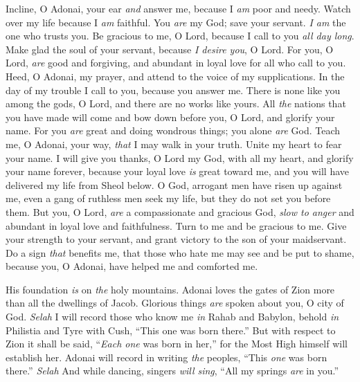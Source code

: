 \begin{biblechapter} %
 Incline, O Adonai, your ear \textit{and} answer me, 
because I \textit{am} poor and needy.
\verse Watch over my life because I \textit{am} faithful. 
You \textit{are} my God; save your servant. 
\textit{I am} the one who trusts you.
\verse Be gracious to me, O Lord, 
because I call to you \textit{all day long}.
\verse Make glad the soul of your servant, 
because \textit{I desire you}, O Lord.
\verse For you, O Lord, \textit{are} good and forgiving, 
and abundant in loyal love for all who call to you.
\verse Heed, O Adonai, my prayer, 
and attend to the voice of my supplications.
\verse In the day of my trouble I call to you, 
because you answer me.
\verse There is none like you among the gods, O Lord, 
and there are no works like yours.
\verse All \textit{the} nations that you have made will come 
and bow down before you, O Lord, 
and glorify your name.
\verse For you \textit{are} great and doing wondrous things; 
you alone \textit{are} God.
\verse Teach me, O Adonai, your way, 
\textit{that} I may walk in your truth. 
Unite my heart to fear your name.
\verse I will give you thanks, O Lord my God, with all my heart, 
and glorify your name forever,
\verse because your loyal love \textit{is} great toward me, 
and you will have delivered my life from Sheol below.
\verse O God, arrogant men have risen up against me, 
even a gang of ruthless men seek my life, 
but they do not set you before them.
\verse But you, O Lord, \textit{are} a compassionate and gracious God, 
\textit{slow to anger} and abundant in loyal love and faithfulness.
\verse Turn to me and be gracious to me. 
Give your strength to your servant, 
and grant victory to the son of your maidservant.
\verse Do a sign \textit{that} benefits me, 
that those who hate me may see and be put to shame, 
because you, O Adonai, have helped me and comforted me.
\end{biblechapter}

\begin{biblechapter} %
 His foundation \textit{is} on \textit{the} holy mountains.
\verse Adonai loves the gates of Zion 
more than all the dwellings of Jacob.
\verse Glorious things \textit{are} spoken about you, 
O city of God. \textit{Selah}
\verse I will record those who know me 
\textit{in} Rahab and Babylon, 
behold \textit{in} Philistia and Tyre with Cush, 
“This one was born there.”
\verse But with respect to Zion it shall be said, 
“\textit{Each one} was born in her,” 
for the Most High himself will establish her.
\verse Adonai will record in writing \textit{the} peoples, 
“This \textit{one} was born there.” \textit{Selah}
\verse And while dancing, singers \textit{will sing}, 
“All my springs \textit{are} in you.”
\end{biblechapter}


